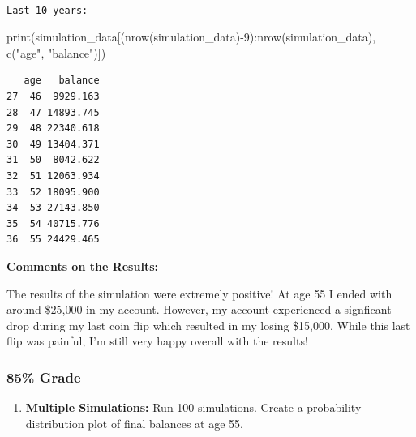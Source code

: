 \documentclass[
  letterpaper,
  DIV=11,
  numbers=noendperiod]{scrartcl}
\newenvironment{Shaded}{\begin{snugshade}}{\end{snugshade}}
\newcommand{\DecValTok}[1]{\textcolor[rgb]{0.68,0.00,0.00}{#1}}
\newcommand{\FunctionTok}[1]{\textcolor[rgb]{0.28,0.35,0.67}{#1}}
\newcommand{\NormalTok}[1]{\textcolor[rgb]{0.00,0.23,0.31}{#1}}
\newcommand{\SpecialCharTok}[1]{\textcolor[rgb]{0.37,0.37,0.37}{#1}}
\newcommand{\StringTok}[1]{\textcolor[rgb]{0.13,0.47,0.30}{#1}}
\providecommand{\tightlist}{%
  \setlength{\itemsep}{0pt}\setlength{\parskip}{0pt}}
\begin{document}
\begin{verbatim}

Last 10 years:
\end{verbatim}

\begin{Shaded}
\begin{Highlighting}[]
\FunctionTok{print}\NormalTok{(simulation\_data[(}\FunctionTok{nrow}\NormalTok{(simulation\_data)}\SpecialCharTok{{-}}\DecValTok{9}\NormalTok{)}\SpecialCharTok{:}\FunctionTok{nrow}\NormalTok{(simulation\_data), }\FunctionTok{c}\NormalTok{(}\StringTok{"age"}\NormalTok{, }\StringTok{"balance"}\NormalTok{)])}
\end{Highlighting}
\end{Shaded}

\begin{verbatim}
   age   balance
27  46  9929.163
28  47 14893.745
29  48 22340.618
30  49 13404.371
31  50  8042.622
32  51 12063.934
33  52 18095.900
34  53 27143.850
35  54 40715.776
36  55 24429.465
\end{verbatim}

\textbf{Comments on the Results:}

The results of the simulation were extremely positive! At age 55 I ended
with around \$25,000 in my account. However, my account experienced a
signficant drop during my last coin flip which resulted in my losing
\$15,000. While this last flip was painful, I'm still very happy overall
with the results!

\subsubsection{85\% Grade}\label{grade-1}

\begin{enumerate}
\def\labelenumi{\arabic{enumi}.}
\setcounter{enumi}{3}
\tightlist
\item
  \textbf{Multiple Simulations:} Run 100 simulations. Create a
  probability distribution plot of final balances at age 55.
\end{enumerate}
\end{document}
